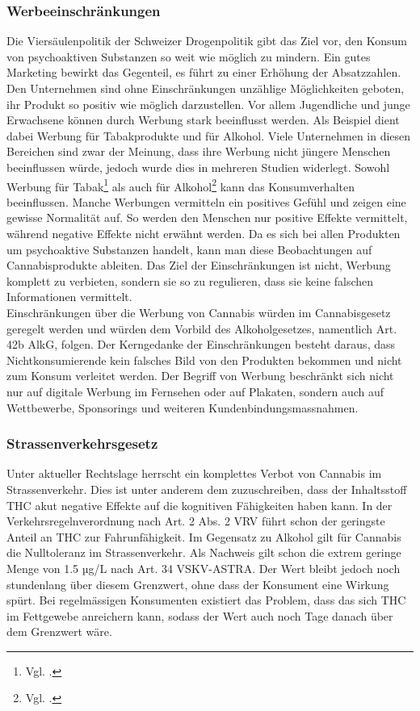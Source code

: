 \documentclass[../main.tex]{subfiles}
\begin{document}
	 \subsubsection{Werbeeinschränkungen}
	 Die Viersäulenpolitik der Schweizer Drogenpolitik gibt das Ziel vor, den Konsum von psychoaktiven Substanzen so weit wie möglich zu mindern.
	 Ein gutes Marketing bewirkt das Gegenteil, es führt zu einer Erhöhung der Absatzzahlen.
	 Den Unternehmen sind ohne Einschränkungen unzählige Möglichkeiten geboten, ihr Produkt so positiv wie möglich darzustellen.	 
	 Vor allem Jugendliche und junge Erwachsene können durch Werbung stark beeinflusst werden.
	 Als Beispiel dient dabei Werbung für Tabakprodukte und für Alkohol.
	 Viele Unternehmen in diesen Bereichen sind zwar der Meinung, dass ihre Werbung nicht jüngere Menschen beeinflussen würde, jedoch wurde dies in mehreren Studien widerlegt.
	 Sowohl Werbung für Tabak\footnote{Vgl. \cite{lovato}.} als auch für Alkohol\footnote{Vgl. \cite{jernigan}.} kann das Konsumverhalten beeinflussen.
	 Manche Werbungen vermitteln ein positives Gefühl und zeigen eine gewisse Normalität auf. 
	 So werden den Menschen nur positive Effekte vermittelt, während negative Effekte nicht erwähnt werden.
	 Da es sich bei allen Produkten um psychoaktive Substanzen handelt, kann man diese Beobachtungen auf Cannabisprodukte ableiten.
	 Das Ziel der Einschränkungen ist nicht, Werbung komplett zu verbieten, sondern sie so zu regulieren, dass sie keine falschen Informationen vermittelt.\\
	 
	 \noindent	 
	 Einschränkungen über die Werbung von Cannabis würden im Cannabisgesetz geregelt werden und würden dem Vorbild des Alkoholgesetzes, namentlich Art. 42b AlkG, folgen.
	 Der Kerngedanke der Einschränkungen besteht daraus, dass Nichtkonsumierende kein falsches Bild von den Produkten bekommen und nicht zum Konsum verleitet werden.
	 Der Begriff von Werbung beschränkt sich nicht nur auf digitale Werbung im Fernsehen oder auf Plakaten, sondern auch auf Wettbewerbe, Sponsorings und weiteren Kundenbindungsmassnahmen.
	 
	 	 
	 \subsubsection{Strassenverkehrsgesetz}
	 Unter aktueller Rechtslage herrscht ein komplettes Verbot von Cannabis im Strassenverkehr. 
	 Dies ist unter anderem dem zuzuschreiben, dass der Inhaltsstoff THC akut negative Effekte auf die kognitiven Fähigkeiten haben kann.	 
	 In der Verkehrsregelnverordnung nach Art. 2 Abs. 2 VRV führt schon der geringste Anteil an THC zur Fahrunfähigkeit.
	 Im Gegensatz zu Alkohol gilt für Cannabis die Nulltoleranz im Strassenverkehr.
	 Als Nachweis gilt schon die extrem geringe Menge von 1.5 µg/L nach Art. 34 VSKV-ASTRA.
	 Der Wert bleibt jedoch noch stundenlang über diesem Grenzwert, ohne dass der Konsument eine Wirkung spürt.
	 Bei regelmässigen Konsumenten existiert das Problem, dass das sich THC im Fettgewebe anreichern kann, sodass der Wert auch noch Tage danach über dem Grenzwert wäre.
	 	 
\end{document}
